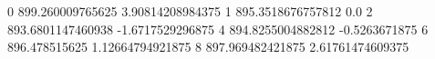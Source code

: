 0 899.260009765625 3.90814208984375
1 895.3518676757812 0.0
2 893.6801147460938 -1.6717529296875
4 894.8255004882812 -0.5263671875
6 896.478515625 1.12664794921875
8 897.969482421875 2.61761474609375

